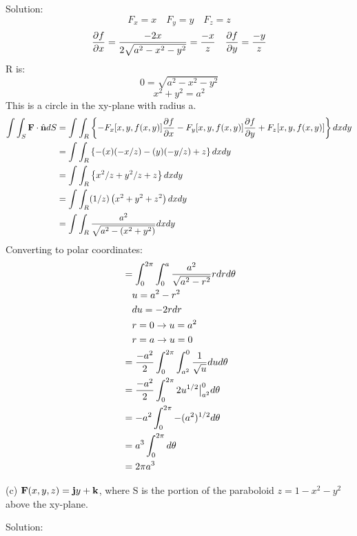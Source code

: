 \documentclass{article}
\begin{document}
\begin{enumerate}
    Solution:
    \[ F_x = x \quad F_y = y \quad F_z = z \]
    \[ \frac{\partial{f}}{\partial{x}} = \frac{-2x}{2\sqrt{a^2 - x^2 - y^2}} = \frac{-x}{z} \quad \frac{\partial{f}}{\partial{y}} = \frac{-y}{z} \]
    R is:
    \[ 0 = \sqrt{a^2 - x^2 - y^2} \]
    \[ x^2 + y^2 = a^2 \]
    This is a circle in the xy-plane with radius a.
    \begin{align*}
        \int\int_S \textbf{F} \cdot \hat{\textbf{n}} dS &= \int\int_R \left\{ -F_x[x,y,f(x,y)]\frac{\partial{f}}{\partial{x}} - F_y[x,y,f(x,y)]\frac{\partial{f}}{\partial{y}} + F_z[x,y,f(x,y)] \right\} dxdy \\
        &= \int\int_R \left\{ -(x)(-x/z) - (y)(-y/z) + z \right\} dxdy \\
        &= \int\int_R \left\{ x^2/z + y^2/z + z \right\} dxdy \\
        &= \int\int_R (1/z)\left( x^2 + y^2 + z^2 \right) dxdy \\
        &= \int\int_R \frac{a^2}{\sqrt{a^2 - (x^2 + y^2)}} dxdy \\
    \end{align*}
    Converting to polar coordinates:
    \begin{align*}
        &= \int_0^{2\pi}\int_0^a \frac{a^2}{\sqrt{a^2 - r^2}} rdrd\theta \\
        & \quad u = a^2-r^2 \\
        & \quad du = -2rdr \\
        & \quad r=0 \rightarrow u=a^2 \\
        & \quad r=a \rightarrow u=0 \\
        &= \frac{-a^2}{2}\int_0^{2\pi}\int_{a^2}^0 \frac{1}{\sqrt{u}} dud\theta \\
        &= \frac{-a^2}{2}\int_0^{2\pi} 2u^{1/2} \big{|}_{a^2}^0 d\theta \\
        &= -a^2\int_0^{2\pi} -(a^2)^{1/2} d\theta \\
        &= a^3\int_0^{2\pi} d\theta \\
        &= 2{\pi}a^3 \\
    \end{align*}

    (c) $\textbf{F}(x,y,z) = \textbf{j}y + \textbf{k}$, where S is the portion of the paraboloid
    $z = 1 - x^2 - y^2$ above the xy-plane.

    Solution:


\end{enumerate}
\end{document}

